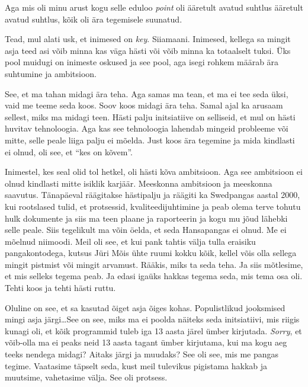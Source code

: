 Aga mis oli minu arust kogu selle eduloo \emph{point} oli ääretult avatud 
suhtlus ääretult avatud suhtlus, kõik oli  ära tegemisele suunatud. 


Tead, mul alati usk, et inimesed on \emph{key}. Siiamaani. Inimesed, kellega sa 
mingit asja teed asi võib minna kas väga hästi või võib minna ka totaalselt 
tuksi. Üks pool muidugi on inimeste oskused ja see pool, aga isegi rohkem 
määrab ära suhtumine ja ambitsioon. 


See, et ma tahan midagi ära teha. Aga samas ma tean, et ma ei tee seda üksi, 
vaid me teeme seda koos. Soov koos midagi ära teha. Samal ajal ka arusaam 
sellest, miks ma midagi teen. Hästi palju initsiatiive on selliseid, et mul on  
hästi huvitav tehnoloogia. Aga kas see tehnoloogia lahendab mingeid probleeme 
või mitte, selle peale liiga palju ei mõelda. Just  koos ära tegemine ja mida 
kindlasti ei olnud, oli see, et \enquote{kes on kõvem}.

Inimestel, kes seal olid tol hetkel, oli hästi kõva ambitsioon. Aga see 
ambitsioon ei olnud kindlasti mitte isiklik karjäär.  Meeskonna ambitsioon ja 
meeskonna saavutus. Tänapäeval räägitakse hästipalju ja räägiti ka Swedpangas 
aastal 2000, kui rootslased tulid, et protsessid, kvaliteedijuhtimine ja peab 
olema terve tohutu hulk dokumente ja siis ma teen plaane ja  raporteerin ja 
kogu mu jõud lähebki  selle peale. Siis tegelikult ma võin öelda, et seda 
Hansapangas ei olnud. Me ei mõelnud niimoodi. Meil oli see, et kui pank tahtis 
välja tulla eraisiku pangakontodega, kutsus Jüri Mõis 
ühte ruumi kokku kõik, kellel võis olla sellega mingit pistmist või mingit 
arvamust. Rääkis, miks ta seda teha. Ja siis mõtlesime, et mis selleks tegema 
peab. Ja edasi igaüks hakkas tegema seda, mis tema osa oli. Tehti koos ja tehti 
hästi ruttu. 


Oluline on see, et sa kasutad õiget asja õiges kohas. Populistlikud jooksmised 
mingi asja järgi\ldots See on see, miks ma ei poolda näiteks seda initsiatiivi, 
mis riigis  kunagi oli, et kõik programmid tuleb iga 13 aasta järel ümber 
kirjutada. \emph{Sorry}, et võib-olla ma ei peaks neid 13 aasta tagant ümber 
kirjutama, kui ma kogu aeg teeks nendega midagi? Aitaks järgi ja muudaks? See 
oli see, mis me pangas tegime. Vaatasime täpselt seda,  kust meil tulevikus 
pigistama hakkab ja muutsime, vahetasime välja. See oli protsess. 

